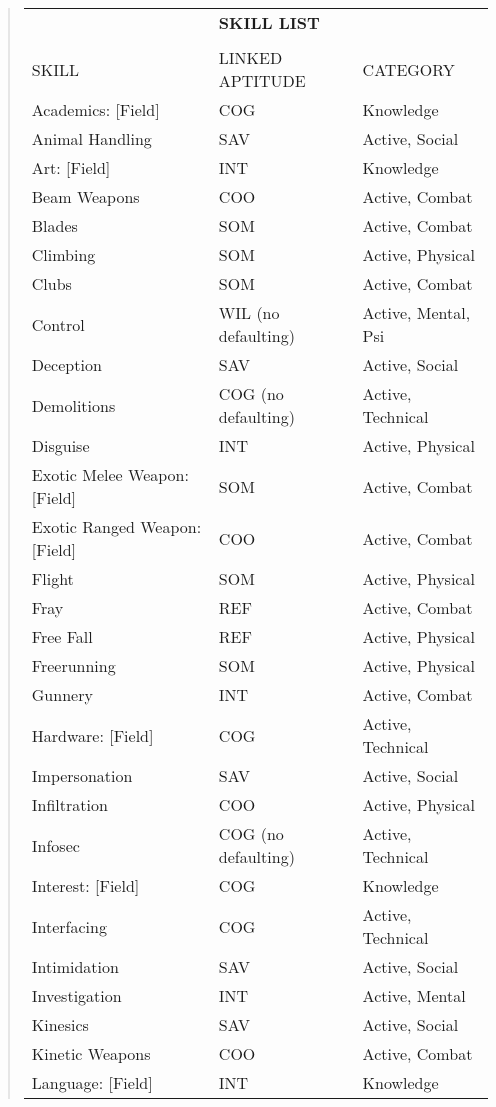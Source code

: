 \begin{quotation}
\begin{tabular}{lll}
& \textbf{SKILL LIST} &\\
\\
SKILL &  LINKED APTITUDE  & CATEGORY\\
Academics: [Field] & COG & Knowledge\\
Animal Handling & SAV & Active, Social\\
Art: [Field] & INT & Knowledge\\
Beam Weapons & COO & Active, Combat\\
Blades & SOM & Active, Combat\\
Climbing & SOM & Active, Physical\\
Clubs & SOM & Active, Combat\\
Control & WIL (no defaulting) & Active, Mental, Psi\\
Deception & SAV & Active, Social\\
Demolitions & COG (no defaulting) & Active, Technical\\
Disguise & INT & Active, Physical\\
Exotic Melee Weapon: [Field] & SOM & Active, Combat\\
Exotic Ranged Weapon: [Field] & COO & Active, Combat\\
Flight & SOM & Active, Physical\\
Fray & REF & Active, Combat\\
Free Fall & REF & Active, Physical\\
Freerunning & SOM & Active, Physical\\
Gunnery & INT & Active, Combat\\
Hardware: [Field] & COG & Active, Technical\\
Impersonation & SAV & Active, Social\\
Infiltration & COO & Active, Physical\\
Infosec & COG (no defaulting) & Active, Technical\\
Interest: [Field] & COG & Knowledge\\
Interfacing & COG & Active, Technical\\
Intimidation & SAV & Active, Social\\
Investigation & INT & Active, Mental\\
Kinesics & SAV & Active, Social\\
Kinetic Weapons & COO & Active, Combat\\
Language: [Field] & INT & Knowledge\\

\end{tabular}
\end{quotation}
